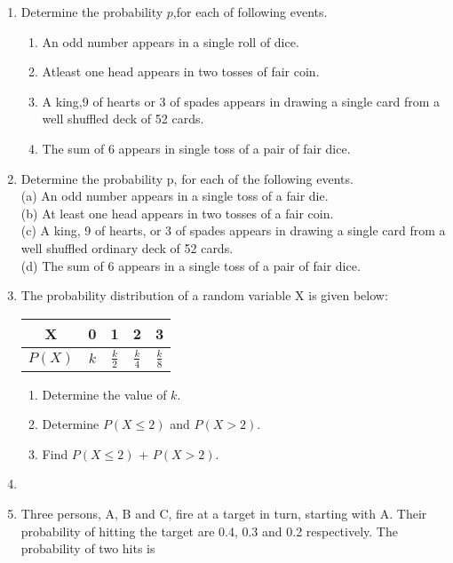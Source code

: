 \begin{enumerate}[label=\thesection.\arabic*,ref=\thesection.\theenumi]
\item Determine the probability $p$,for each of following events.
\begin{enumerate}
\item An odd number appears in a single roll of dice.
\item Atleast one head appears in two tosses of fair coin.
\item A king,9 of hearts or 3 of spades appears in drawing a single card from a well shuffled deck of 52 cards.
\item The sum of 6 appears in single toss of a pair of fair dice.
\end{enumerate}

\item Determine the probability p, for each of the following events.\\
(a) An odd number appears in a single toss of a fair die.\\
(b) At least one head appears in two tosses of a fair coin.\\
(c) A king, 9 of hearts, or 3 of spades appears in drawing a single card from a
well shuffled ordinary deck of 52 cards.\\
(d) The sum of 6 appears in a single toss of a pair of fair dice.

\item The probability distribution of a random variable X is given below:
\begin{table}[h]
    \centering
    \begin{tabular}{|c|c|c|c|c|}
        \hline
        X & 0 & 1 & 2 & 3 \\
        \hline
        $P(X)$ & $k$ & $\frac{k}{2}$ & $\frac{k}{4}$ & $\frac{k}{8}$ \\
        \hline
    \end{tabular}
\end{table}
\begin{enumerate}
    \item Determine the value of $k$.
    \item Determine $P(X \le 2)$ and $P(X > 2)$.
    \item Find $P(X \le 2)$ + $P(X > 2)$.
\end{enumerate}
\solution

\item 
\item Three persons, A, B and C, fire at a target in turn, starting with A. Their probability of hitting the target are 0.4, 0.3 and 0.2 respectively. The probability of two hits is\\

\end{enumerate}
